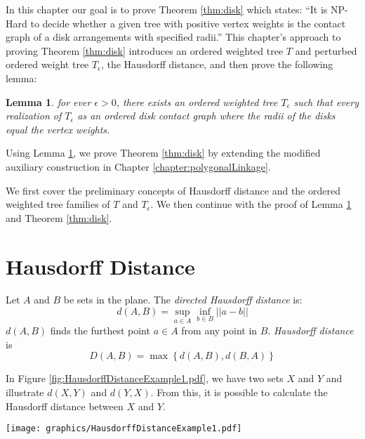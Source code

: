 \documentclass[10pt]{CSUNthesis}
\theoremstyle{plain}%
\newtheorem{lem}{Lemma}
\theoremstyle{definition}
\theoremstyle{remark}
\newcommand{\lr}[1]{\left( #1 \right)}
\begin{document}
In this chapter our goal is to prove Theorem \ref{thm:disk} which states: ``It is NP-Hard to decide whether a given tree with positive vertex weights is the contact graph of a disk arrangements with specified radii.''  
This chapter's approach to proving Theorem \ref{thm:disk} introduces an ordered weighted tree $T$ and perturbed ordered weight tree $T_\epsilon$, the Hausdorff distance, and then prove the following lemma:
\begin{lem}\label{lem:ch4IntroLemma}
for ever $\epsilon > 0$, there exists an ordered weighted tree $T_\epsilon$ such that every realization of $T_\epsilon$ as an ordered disk contact graph where the radii of the disks equal the vertex weights.
\end{lem} 
Using Lemma \ref{lem:ch4IntroLemma}, we prove Theorem \ref{thm:disk} by extending the modified auxiliary construction in Chapter \ref{chapter:polygonalLinkage}.  

We first cover the preliminary concepts of Hausdorff distance and the ordered weighted tree families of $T$ and $T_\epsilon$.  
We then continue with the proof of Lemma \ref{lem:ch4IntroLemma} and Theorem \ref{thm:disk}.  
\section{Hausdorff Distance}  
Let $A$ and $B$ be sets in the plane. The \textit{directed Hausdorff distance} is: 
\begin{equation}\label{eqn:ContactGraphV3-1}
d\lr{A,B} = \sup_{a \in A} \inf_{b \in B} \left\vert\left\vert a-b \right\vert \right\vert
\end{equation}
$d\lr{A,B}$ finds the furthest point $a \in A$ from any point in $B$.  \textit{Hausdorff distance} is
\begin{equation}\label{eqn:ContactGraphV3-2}
D\lr{A,B} = \max \left\lbrace d\lr{A,B}, d\lr{B,A} \right\rbrace
\end{equation}

In Figure \ref{fig:HausdorffDistanceExample1.pdf}, we have two sets $X$ and $Y$ and illustrate $d(X,Y)$ and $d(Y,X)$.  
From this, it is possible to calculate the Hausdorff distance between $X$ and $Y$.

\begin{minipage}{\linewidth}
\begin{center}
\texttt{[image: graphics/HausdorffDistanceExample1.pdf]}
\label{fig:HausdorffDistanceExample1.pdf}
\end{center}
\end{minipage}
\end{document}

